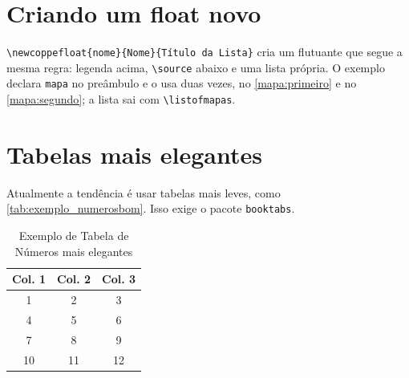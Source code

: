 \documentclass[dsc,pdfa]{coppe}
\begin{document}
\section{Criando um float novo}

\verb|\newcoppefloat{nome}{Nome}{Título da Lista}| cria um flutuante que segue a mesma regra: legenda acima, \verb|\source| abaixo e uma lista própria. O exemplo declara \verb|mapa| no preâmbulo e o usa duas vezes, no \autoref{mapa:primeiro} e no \autoref{mapa:segundo}; a lista sai com \verb|\listofmapas|.

\begin{mapa}[ht]
\centering
\caption{Primeiro mapa, num float criado pelo autor}
\label{mapa:primeiro}
\end{mapa}

\begin{mapa}[ht]
\centering
\caption{Segundo mapa, para provar o contador e a lista}
\label{mapa:segundo}
\end{mapa}

\section{Tabelas mais elegantes}

Atualmente a tendência é usar tabelas mais leves, como \autoref{tab:exemplo_numerosbom}. Isso exige o pacote \verb*|booktabs|.

\begin{table}[ht]
\centering %
\caption{Exemplo de Tabela de Números mais elegantes}
\label{tab:exemplo_numerosbom}
\begin{tabular}{ccc} %
\toprule %
\textbf{Col. 1} & \textbf{Col. 2} & \textbf{Col. 3} \\ %
\midrule %
1 & 2 & 3 \\ %
4 & 5 & 6 \\ %
7 & 8 & 9 \\ %
10 & 11 & 12 \\ %
\bottomrule %
\end{tabular}
\end{table}
\end{document}
